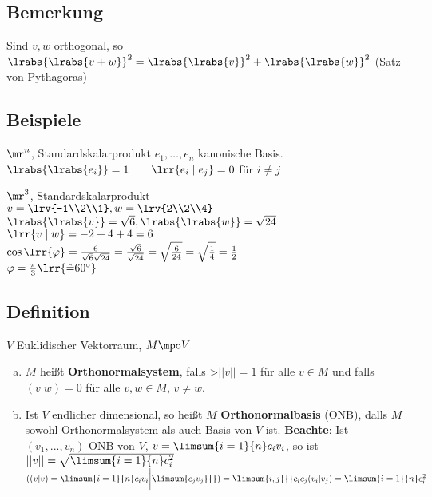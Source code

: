\subsection{Bemerkung}
	Sind $v,w$ orthogonal, so $\lrabs{\lrabs{v+w}}^2=\lrabs{\lrabs{v}}^2+\lrabs{\lrabs{w}}^2$ (Satz von Pythagoras)

\subsection{Beispiele}
	\item $\mr^n$, Standardskalarprodukt $e_1,\dots,e_n$ kanonische Basis.\\
		$\lrabs{\lrabs{e_i}}=1\qquad\lrr{e_i\mid e_j}=0$ für $i\neq j$
	\item $\mr^3$, Standardskalarprodukt\\
		$v=\lrv{-1\\2\\1}, w=\lrv{2\\2\\4}$\\
		$\lrabs{\lrabs{v}}=\sqrt{6},\lrabs{\lrabs{w}}=\sqrt{24}$\\
		$\lrr{v\mid w}=-2+4+4=6$\\
		$\cos\lrr{\varphi}=\frac{6}{\sqrt{6}\sqrt{24}}=\frac{\sqrt{6}}{\sqrt{24}}=\sqrt{\frac{6}{24}}=\sqrt{\frac{1}{4}}=\frac{1}{2}$\\
		$\varphi=\frac{\pi}{3}\lrr{\hat{=}60^\circ}$
\subsection{Definition}
	$ V $ Euklidischer Vektorraum, $ M\mpo V $
	\begin{enumerate}[a)]
		\item $ M $ heißt \textbf{Orthonormalsystem}, falls >$ ||v||=1 $ für alle $ v\in M $ und falls $ (v|w)=0 $ für alle $ v,w\in M $, $ v\neq w $.
		\item Ist $ V $ endlicher dimensional, so heißt $ M $ \textbf{Orthonormalbasis} (ONB), dalls $ M $ sowohl Orthonormalsystem als auch Basis von $ V $ ist.
      \textbf{Beachte}: Ist $ (v_1,...,v_n) $ ONB von $ V $, $ v=\limsum{i=1}{n}c_iv_i $, so ist $ ||v||=\sqrt{\limsum{i=1}{n}c_i^2} $\\
      $ ((v|v)=\limsum{i=1}{n}c_iv_i\bigg|\limsum{c_jv_j}{})=\limsum{i,j}{}c_ic_j(v_i|v_j)=\limsum{i=1}{n}c_i^2 $
	\end{enumerate}
